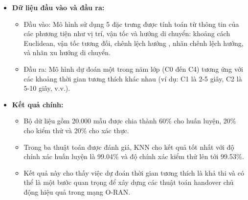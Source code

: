 \documentclass{article} %
\begin{document}
\begin{itemize}
\begin{itemize}
\begin{itemize}
            \item Neural Network (NN): Một mô hình học sâu gồm nhiều lớp để trích xuất các đặc trưng phức tạp từ dữ liệu.
        \end{itemize}
    \end{itemize}
    \item \textbf{Dữ liệu đầu vào và đầu ra:}
    \begin{itemize}
        \item Đầu vào: Mô hình sử dụng 5 đặc trưng được tính toán từ thông tin của các phương tiện như vị trí, vận tốc và hướng di chuyển: khoảng cách Euclidean, vận tốc tương đối, chênh lệch hướng , nhãn chênh lệch hướng, và nhãn xu hướng di chuyển.
        \item Đầu ra: Mô hình dự đoán một trong năm lớp (C0 đến C4) tương ứng với các khoảng thời gian tương thích khác nhau (ví dụ: C1 là 2-5 giây, C2 là 5-10 giây, v.v.).
    \end{itemize}
    \item \textbf{\textbf{Kết quả chính:}}
    \begin{itemize}
        \item Bộ dữ liệu gồm 20.000 mẫu được chia thành 60\% cho huấn luyện, 20\% cho kiểm thử và 20\% cho xác thực.
        \item Trong ba thuật toán được đánh giá, KNN cho kết quả tốt nhất với độ chính xác huấn luyện là 99.04\% và độ chính xác kiểm thử lên tới 99.53\%.
        \item Kết quả này cho thấy việc dự đoán thời gian tương thích là khả thi và có thể là một bước quan trọng để xây dựng các thuật toán handover chủ động hiệu quả trong mạng O-RAN.
    \end{itemize}
\end{itemize}
\end{document}
